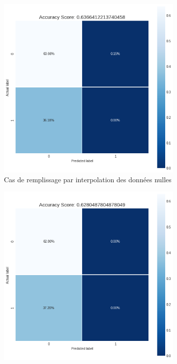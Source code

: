 \documentclass[12pt, a4paper]{article}
\begin{document}
    \begin{figure}[H]
     \centering
     \begin{subfigure}[b]{6.75cm}
           \centering
           \includegraphics[width=\textwidth]{images/confusion_matrix_log_case1.png}
           \caption{Cas de remplissage par interpolation des données nulles}
            \label{fig:corr_matrix_inter}
     \end{subfigure}
     \hfill
     \begin{subfigure}[b]{6.75cm}
            \centering
           \includegraphics[width=\textwidth]{images/confusion_matrix_log_case2.png}

\end{subfigure}
\end{figure}
\end{document}
